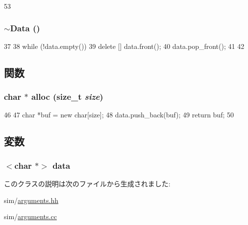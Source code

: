 \begin{DoxyCode}
53 {}
\end{DoxyCode}
\hypertarget{classArguments_1_1Data_a6da8ae30c57cc1732f240fc3496ee7de}{
\subsubsection[{$\sim$Data}]{\setlength{\rightskip}{0pt plus 5cm}$\sim${\bf Data} ()}}
\label{classArguments_1_1Data_a6da8ae30c57cc1732f240fc3496ee7de}



\begin{DoxyCode}
37 {
38     while (!data.empty()) {
39         delete [] data.front();
40         data.pop_front();
41     }
42 }
\end{DoxyCode}


\subsection{関数}
\hypertarget{classArguments_1_1Data_aeb27080055c9e3a4b7844ccabbd6b823}{
\subsubsection[{alloc}]{\setlength{\rightskip}{0pt plus 5cm}char $\ast$ alloc (size\_\-t {\em size})}}
\label{classArguments_1_1Data_aeb27080055c9e3a4b7844ccabbd6b823}



\begin{DoxyCode}
46 {
47     char *buf = new char[size];
48     data.push_back(buf);
49     return buf;
50 }
\end{DoxyCode}


\subsection{変数}
\hypertarget{classArguments_1_1Data_acd34815bf6806434e82e5ce7e9656b16}{
\subsubsection[{data}]{$<$char $\ast$$>$ {\bf data}}}
\label{classArguments_1_1Data_acd34815bf6806434e82e5ce7e9656b16}


このクラスの説明は次のファイルから生成されました:\begin{DoxyCompactItemize}
\item 
sim/\hyperlink{arguments_8hh}{arguments.hh}\item 
sim/\hyperlink{arguments_8cc}{arguments.cc}\end{DoxyCompactItemize}
